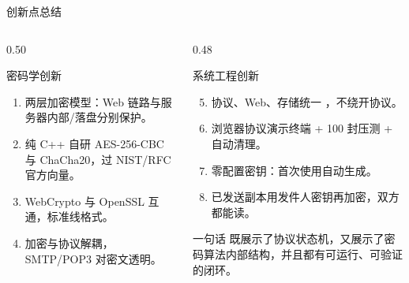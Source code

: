 \documentclass[aspectratio=169,10pt]{beamer}
\newcommand{\code}[1]{\texttt{\small\detokenize{#1}}}
\begin{document}
\begin{frame}{创新点总结}
  \begin{columns}[T]
    \begin{column}{0.50\textwidth}
      \begin{block}{密码学创新}
        \small
        \begin{enumerate}
          \item 两层加密模型：Web 链路与服务器内部/落盘分别保护。
          \item 纯 C++ 自研 AES-256-CBC 与 ChaCha20，过 NIST/RFC 官方向量。
          \item WebCrypto 与 OpenSSL 互通，标准线格式。
          \item 加密与协议解耦，SMTP/POP3 对密文透明。
        \end{enumerate}
      \end{block}
    \end{column}
    \begin{column}{0.48\textwidth}
      \begin{block}{系统工程创新}
        \small
        \begin{enumerate}
          \setcounter{enumi}{4}
          \item 协议、Web、存储统一 \code{.eml}，不绕开协议。
          \item 浏览器协议演示终端 + 100 封压测 + 自动清理。
          \item 零配置密钥：首次使用自动生成。
          \item 已发送副本用发件人密钥再加密，双方都能读。
        \end{enumerate}
      \end{block}
      \begin{alertblock}{一句话}
        \small
        既展示了协议状态机，又展示了密码算法内部结构，并且都有可运行、可验证的闭环。
      \end{alertblock}
    \end{column}
  \end{columns}
\end{frame}
\end{document}
